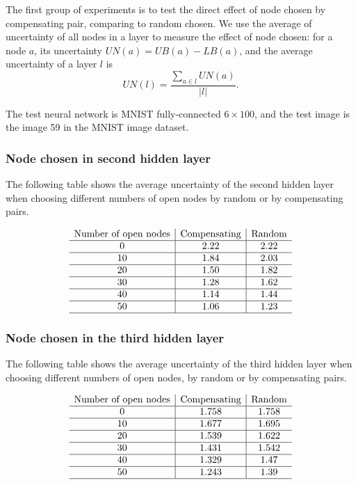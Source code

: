 \documentclass{llncs}
\begin{document}
The first group of experiments is to test the direct effect of node chosen by compensating pair, comparing to random chosen. We use the average of uncertainty of all nodes in a layer to measure the effect of node chosen: for a node $a$, its uncertainty $UN(a) = UB(a)-LB(a)$, and the average uncertainty of a layer $l$ is $$UN(l) = \dfrac{\sum_{a\in l}UN(a)}{|l|}.$$

The test neural network is MNIST fully-connected $6\times 100$, and the test image is the image 59 in the MNIST image dataset. 

\subsubsection*{Node chosen in second hidden layer}

The following table shows the average uncertainty of the second hidden layer when choosing different numbers of open nodes by random or by compensating pairs.

\[
\begin{array}{c|c|c}

	\text{Number of open nodes}  &  \text{Compensating} & \text{Random}  \\ \hline
	0  &  2.22 & 2.22  \\ \hline
	10  &  1.84 & 2.03  \\ \hline
	20  &  1.50 & 1.82  \\ \hline
	30  &  1.28 & 1.62  \\ \hline
	40  &  1.14 & 1.44  \\ \hline
	50  &  1.06 & 1.23  \\ \hline
\end{array}
\]


\subsubsection*{Node chosen in the third hidden layer}

The following table shows the average uncertainty of the third hidden layer when choosing different numbers of open nodes, by random or by compensating pairs.


\[
\begin{array}{c|c|c}
	
	\text{Number of open nodes}  &  \text{Compensating} & \text{Random}  \\ \hline
	0  &  1.758 & 1.758  \\ \hline
	10  &  1.677 & 1.695  \\ \hline
	20  &  1.539 & 1.622  \\ \hline
	30  &  1.431 & 1.542  \\ \hline
	40  &  1.329 & 1.47  \\ \hline
	50  &  1.243 & 1.39  \\ \hline
\end{array}
\]
\end{document}
